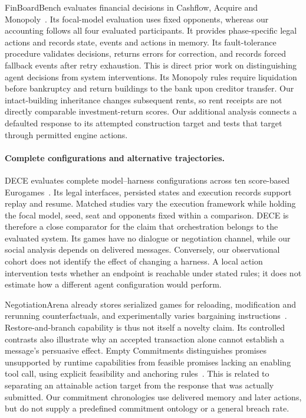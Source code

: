 FinBoardBench evaluates financial decisions in Cashflow, Acquire and Monopoly~\cite{hu2026finboardbench}. Its focal-model evaluation uses fixed opponents, whereas our accounting follows all four evaluated participants. It provides phase-specific legal actions and records state, events and actions in memory. Its fault-tolerance procedure validates decisions, returns errors for correction, and records forced fallback events after retry exhaustion. This is direct prior work on distinguishing agent decisions from system interventions. Its Monopoly rules require liquidation before bankruptcy and return buildings to the bank upon creditor transfer. Our intact-building inheritance changes subsequent rents, so rent receipts are not directly comparable investment-return scores. Our additional analysis connects a defaulted response to its attempted construction target and tests that target through permitted engine actions.

\paragraph{Complete configurations and alternative trajectories.}
DECE evaluates complete model--harness configurations across ten score-based Eurogames~\cite{zhang2026dece}. Its legal interfaces, persisted states and execution records support replay and resume. Matched studies vary the execution framework while holding the focal model, seed, seat and opponents fixed within a comparison. DECE is therefore a close comparator for the claim that orchestration belongs to the evaluated system. Its games have no dialogue or negotiation channel, while our social analysis depends on delivered messages. Conversely, our observational cohort does not identify the effect of changing a harness. A local action intervention tests whether an endpoint is reachable under stated rules; it does not estimate how a different agent configuration would perform.

NegotiationArena already stores serialized games for reloading, modification and rerunning counterfactuals, and experimentally varies bargaining instructions~\cite{bianchi2024negotiationarena}. Restore-and-branch capability is thus not itself a novelty claim. Its controlled contrasts also illustrate why an accepted transaction alone cannot establish a message's persuasive effect. Empty Commitments distinguishes promises unsupported by runtime capabilities from feasible promises lacking an enabling tool call, using explicit feasibility and anchoring rules~\cite{empty_commitments_v2}. This is related to separating an attainable action target from the response that was actually submitted. Our commitment chronologies use delivered memory and later actions, but do not supply a predefined commitment ontology or a general breach rate.

